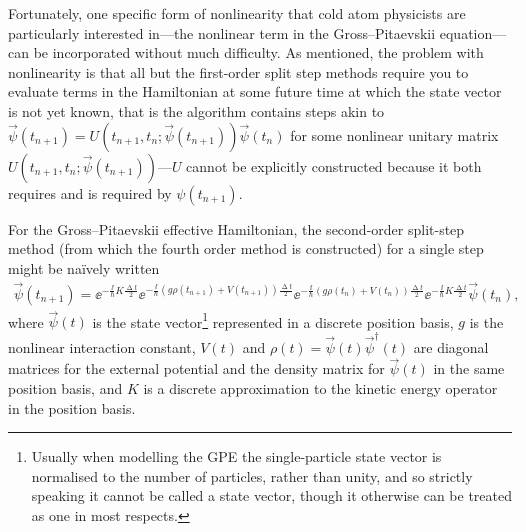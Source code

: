 Fortunately, one specific form of nonlinearity that cold atom physicists are particularly interested in---the nonlinear term in the Gross--Pitaevskii equation---can be incorporated without much difficulty. As mentioned, the problem with nonlinearity is that all but the first-order split step methods require you to evaluate terms in the Hamiltonian at some future time at which the state vector is not yet known, that is the algorithm contains steps akin to $\vec \psi(t_{n+1}) = U(t_{n+1}, t_n; \vec\psi(t_{n+1})) \vec \psi(t_n)$ for some nonlinear unitary matrix $U(t_{n+1}, t_n; \vec\psi(t_{n+1}))$---$U$ cannot be explicitly constructed because it both requires and is required by $\psi(t_{n+1})$.

For the Gross--Pitaevskii effective Hamiltonian, the second-order split-step method (from which the fourth order method is constructed) for a single step might be na\"ively written
\begin{align}
\vec \psi(t_{n+1}) =
\ee^{-\frac\ii\hbar K \frac{\upDelta t} 2}
\ee^{-\frac\ii\hbar (g\rho(t_{n+1}) + V(t_{n+1})) \frac{\upDelta t} 2}
\ee^{-\frac\ii\hbar (g\rho(t_n) + V(t_n) ) \frac{\upDelta t} 2}
\ee^{-\frac\ii\hbar K \frac{\upDelta t} 2}
\vec \psi(t_n),
\end{align}
where $\vec\psi(t)$ is the state vector\footnote{Usually when modelling the GPE the single-particle state vector is normalised to the number of particles, rather than unity, and so strictly speaking it cannot be called a state vector, though it otherwise can be treated as one in most respects.} represented in a discrete position basis, $g$ is the nonlinear interaction constant, $V(t)$ and $\rho(t) = \vec\psi(t)\vec\psi^\dagger(t)$ are diagonal matrices for the external potential and the density matrix for $\vec\psi(t)$ in the same position basis, and $K$ is a discrete approximation to the kinetic energy operator in the position basis.


